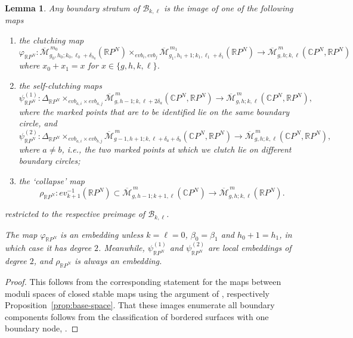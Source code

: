 \documentclass[11pt,psamsfonts, oneside, reqno]{amsart}
\newcommand{\sub}{\subset}%
\newcommand{\inv}{^{-1}}
\newcommand{\cl}{\colon}
\newcommand{\eva}{ev}
\newcommand{\Mbar}{\overline{\mathcal M}}
\newcommand{\bC}{\mathbb{C}}
\newcommand{\bR}{\mathbb{R}}
\newcommand{\cB}{\mathcal{B}}
\newcommand{\evab}{evb}
\newtheorem{lemma}[theorem]{Lemma}
\theoremstyle{definition}
\theoremstyle{remark}
\numberwithin{equation}{section}
\begin{document}
\begin{lemma}\label{prop:boundary-base-space-hg} Any boundary stratum of $\cB_{k,\ell}$ is the image of one of the following  maps
	\begin{enumerate}[label=\arabic*),leftmargin=20pt,ref=\arabic*]
		\item\label{i:clutching-1} the clutching map 
		\begin{equation*}\label{} \varphi_{\bR P^N}\cl \Mbar_{g_0,h_0;k_0,\ell_0+\delta_{h_0}}^{\,m_0}(\bR P^N)\times_{\evab_i,\evab_j}\Mbar_{g_1,h_1+1;k_1,\ell_1+\delta_1}^{\,m_1}(\bR P^N)\to \Mbar^{\,m}_{g,h;k,\ell}(\bC P^N,\bR P^N)\end{equation*}
		where $x_0 + x_1 = x$ for $x \in \{g,h,k,\ell\}$.
		\item\label{i:clutching-2}  the self-clutching maps
		$$\psi_{\bR P^N}^{(1)}\cl \Delta_{\bR P^N}\times_{\evab_{a,i}\times \evab_{a,j}}\Mbar_{g,h-1;k,\ell+2\delta_a}^{\,m}(\bC P^N,\bR P^N)\to \Mbar_{g,h;k,\ell}^{\,m}(\bC P^N,\bR P^N),$$\noindent
		where the marked points that are to be identified lie on the same boundary circle, and 
		$$\psi_{\bR P^N}^{(2)}\cl \Delta_{\bR P^N}\times_{\evab_{a,i}\times \evab_{b,j}} \Mbar_{g-1,h+1;k,\ell + \delta_a +\delta_b}^{\,m}(\bC P^N,\bR P^N)\to \Mbar_{g,h;k,\ell}^{\,m}(\bC P^N,\bR P^N),$$\noindent
		where $a \neq b$, i.e., the two marked points at which we clutch lie on different boundary circles;
		\item\label{i:collapse} the `collapse' map
		$$\rho_{\bR P^N}\cl \eva_{k+1}\inv(\bR P^N)\sub \Mbar_{g,h-1;k+1,\ell}^{\,m}(\bC P^N)\to \Mbar_{g,h;k,\ell}^{\,m}(\bR P^N).$$
	\end{enumerate}
	restricted to the respective preimage of $\cB_{k,\ell}$.\par 
	 The map $\varphi_{\bR P^N}$ is an embedding unless $k =\ell = 0$, $\beta_0 = \beta_1$ and $h_0+1 = h_1$, in which case it has degree $2$. Meanwhile, $\psi_{\bR P^N}^{(1)}$ and $\psi_{\bR P^N}^{(2)}$ are local embeddings of degree $2$, and $\rho_{\bR P^N}$ is always an embedding. 
\end{lemma}

\begin{proof} This follows from the corresponding statement for the maps between moduli spaces of closed stable maps using the argument of \cite[Example~1.5]{ST16}, respectively Proposition~\ref{prop:base-space}. That these images enumerate all boundary components follows from the classification of bordered surfaces with one boundary node, \cite[]{Liu20}.
\end{proof}
\end{document}
